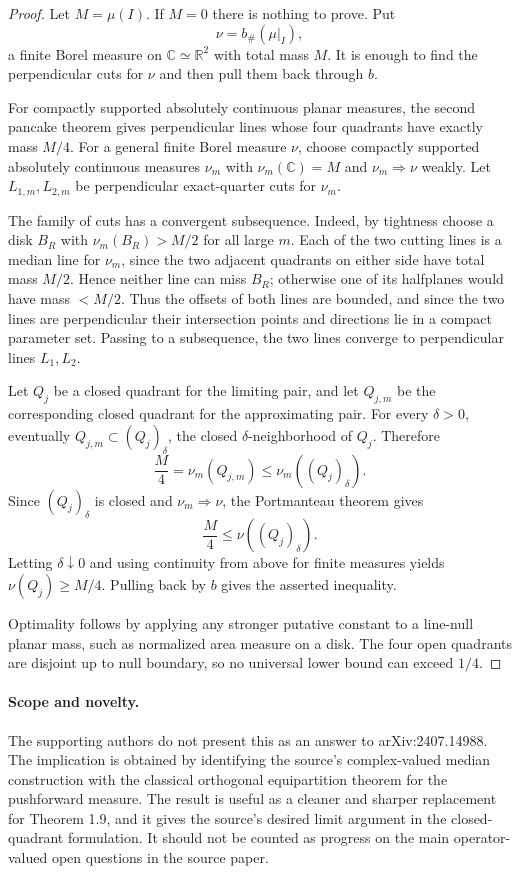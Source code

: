 \documentclass[11pt]{article}
\begin{document}
\begin{proof}
Let $M=\mu(I)$. If $M=0$ there is nothing to prove. Put
\[
  \nu=b_\#(\mu|_I),
\]
a finite Borel measure on $\mathbb C\simeq\mathbb R^2$ with total mass $M$.
It is enough to find the perpendicular cuts for $\nu$ and then pull them back
through $b$.

For compactly supported absolutely continuous planar measures, the second pancake
theorem gives perpendicular lines whose four quadrants have exactly mass $M/4$.
For a general finite Borel measure $\nu$, choose compactly supported absolutely
continuous measures $\nu_m$ with $\nu_m(\mathbb C)=M$ and $\nu_m\Rightarrow\nu$
weakly. Let $L_{1,m},L_{2,m}$ be perpendicular exact-quarter cuts for $\nu_m$.

The family of cuts has a convergent subsequence. Indeed, by tightness choose
a disk $B_R$ with $\nu_m(B_R)>M/2$ for all large $m$. Each of the two cutting
lines is a median line for $\nu_m$, since the two adjacent quadrants on either
side have total mass $M/2$. Hence neither line can miss $B_R$; otherwise one
of its halfplanes would have mass $<M/2$. Thus the offsets of both lines are
bounded, and since the two lines are perpendicular their intersection points
and directions lie in a compact parameter set. Passing to a subsequence, the
two lines converge to perpendicular lines $L_1,L_2$.

Let $Q_j$ be a closed quadrant for the limiting pair, and let $Q_{j,m}$ be the
corresponding closed quadrant for the approximating pair. For every $\delta>0$,
eventually $Q_{j,m}\subset (Q_j)_\delta$, the closed $\delta$-neighborhood of
$Q_j$. Therefore
\[
  \frac{M}{4}=\nu_m(Q_{j,m})\le \nu_m((Q_j)_\delta).
\]
Since $(Q_j)_\delta$ is closed and $\nu_m\Rightarrow\nu$, the Portmanteau theorem
gives
\[
  \frac{M}{4}\le \nu((Q_j)_\delta).
\]
Letting $\delta\downarrow0$ and using continuity from above for finite measures
yields $\nu(Q_j)\ge M/4$. Pulling back by $b$ gives the asserted inequality.

Optimality follows by applying any stronger putative constant to a line-null
planar mass, such as normalized area measure on a disk. The four open quadrants
are disjoint up to null boundary, so no universal lower bound can exceed $1/4$.
\end{proof}

\paragraph{Scope and novelty.}
The supporting authors do not present this as an answer to arXiv:2407.14988.
The implication is obtained by identifying the source's complex-valued median
construction with the classical orthogonal equipartition theorem for the
pushforward measure. The result is useful as a cleaner and sharper replacement
for Theorem 1.9, and it gives the source's desired limit argument in the
closed-quadrant formulation. It should not be counted as progress on the main
operator-valued open questions in the source paper.
\end{document}
